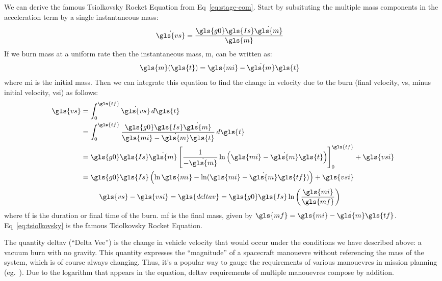 \documentclass[12pt,openany]{book}
\begin{document}
We can derive the famous Tsiolkovsky Rocket Equation from Eq~\ref{eq:stage-eom}. Start by subsituting the multiple mass components in the acceleration term by a single instantaneous mass:
\begin{align}
  \dot{\gls{vs}} &= \frac{\gls{g0}\gls{Is}\dot{\gls{m}}}{\gls{m}}
\end{align}
If we burn mass at a uniform rate then the instantaneous mass, \gls{m}, can be written as:
\begin{align}
  \gls{m}(\gls{t}) &= \gls{mi} - \dot{\gls{m}}\gls{t}
\end{align}
where \gls{mi} is the initial mass. Then we can integrate this equation to find the change in velocity due to the burn (final velocity, \gls{vs}, minus initial velocity, \gls{vsi}) as follows:
\begin{align}
  \gls{vs}
  &=
  \int_0^{\gls{tf}}\dot{\gls{vs}}\,d\gls{t} \\
  &=
  \int_0^{\gls{tf}}\frac{\gls{g0}\gls{Is}\dot{\gls{m}}}{\gls{mi} - \dot{\gls{m}}\gls{t}}\,d\gls{t} \\
  &=
  \gls{g0}\gls{Is}\dot{\gls{m}}
  \left[
    \frac{1}{-\dot{\gls{m}}}\ln\left(\gls{mi} - \dot{\gls{m}}\gls{t}\right)
    \right]^{\gls{tf}}_0 + \gls{vsi} \\
  &=
  \gls{g0}\gls{Is}
  \left(
    \ln\gls{mi} - \ln(\gls{mi} - \dot{\gls{m}}\gls{tf})
  \right) + \gls{vsi}
\end{align}
\begin{align}
  \gls{vs} - \gls{vsi} = \gls{deltav}
  &=
  \gls{g0}\gls{Is} \ln\left(\frac{\gls{mi}}{\gls{mf}}\right)
  \label{eq:tsiolkovsky}
\end{align}
where \gls{tf} is the duration or final time of the burn. \gls{mf} is the final mass, given by \(\gls{mf} = \gls{mi} - \dot{\gls{m}}\gls{tf}\). Eq~\ref{eq:tsiolkovsky} is the famous Tsiolkovsky Rocket Equation.

The quantity \gls{deltav} (``Delta Vee'') is the change in vehicle velocity that would occur under the conditions we have described above: a vacuum burn with no gravity. This quantity expresses the ``magnitude'' of a spacecraft manouevre without referencing the mass of the system, which is of course always changing. Thus, it's a popular way to gauge the requirements of various manouevres in mission planning (eg.~\cite{bennett1970}). Due to the logarithm that appears in the equation, \gls{deltav} requirements of multiple manouevres compose by addition.
\end{document}
